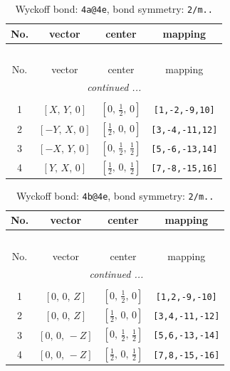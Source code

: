 \documentclass[fleqn,8pt]{jsarticle}
\begin{document}
\begin{longtable}{cccc}
\caption{Wyckoff bond: {\tt 4a@4e}, bond symmetry: {\tt 2/m..}}
 \\
 \hline \hline
No. & vector & center & mapping \\ \hline \endfirsthead

\multicolumn{3}{l}{\tablename\ \thetable{}} \\
 \hline \hline
No. & vector & center & mapping \\ \hline \endhead

 \hline \hline
\multicolumn{3}{r}{\footnotesize\it continued ...} \\ \endfoot

 \hline \hline
\multicolumn{3}{r}{} \\ \endlastfoot

1 & $\left[ X,\, Y,\, 0 \right]$ & $\left[ 0,\, \frac{1}{2},\, 0 \right]$ & {\tt [1,-2,-9,10]} \\ \hline
2 & $\left[ - Y,\, X,\, 0 \right]$ & $\left[ \frac{1}{2},\, 0,\, 0 \right]$ & {\tt [3,-4,-11,12]} \\ \hline
3 & $\left[ - X,\, Y,\, 0 \right]$ & $\left[ 0,\, \frac{1}{2},\, \frac{1}{2} \right]$ & {\tt [5,-6,-13,14]} \\ \hline
4 & $\left[ Y,\, X,\, 0 \right]$ & $\left[ \frac{1}{2},\, 0,\, \frac{1}{2} \right]$ & {\tt [7,-8,-15,16]} \\
\end{longtable}
\renewcommand{\arraystretch}{1.2}
\begin{longtable}{cccc}
\caption{Wyckoff bond: {\tt 4b@4e}, bond symmetry: {\tt 2/m..}}
 \\
 \hline \hline
No. & vector & center & mapping \\ \hline \endfirsthead

\multicolumn{3}{l}{\tablename\ \thetable{}} \\
 \hline \hline
No. & vector & center & mapping \\ \hline \endhead

 \hline \hline
\multicolumn{3}{r}{\footnotesize\it continued ...} \\ \endfoot

 \hline \hline
\multicolumn{3}{r}{} \\ \endlastfoot

1 & $\left[ 0,\, 0,\, Z \right]$ & $\left[ 0,\, \frac{1}{2},\, 0 \right]$ & {\tt [1,2,-9,-10]} \\ \hline
2 & $\left[ 0,\, 0,\, Z \right]$ & $\left[ \frac{1}{2},\, 0,\, 0 \right]$ & {\tt [3,4,-11,-12]} \\ \hline
3 & $\left[ 0,\, 0,\, - Z \right]$ & $\left[ 0,\, \frac{1}{2},\, \frac{1}{2} \right]$ & {\tt [5,6,-13,-14]} \\ \hline
4 & $\left[ 0,\, 0,\, - Z \right]$ & $\left[ \frac{1}{2},\, 0,\, \frac{1}{2} \right]$ & {\tt [7,8,-15,-16]} \\
\end{longtable}
\end{document}
